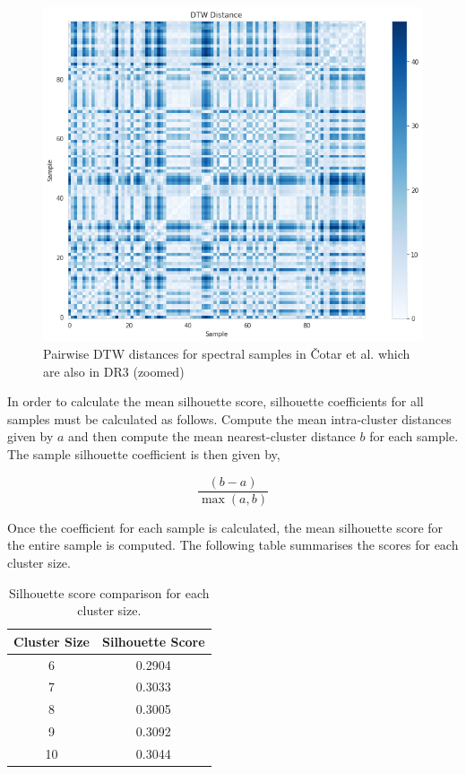 \begin{figure}[t]
\centering
\includegraphics[scale=0.60]{figures/dtw cotar zoomed.png}
\caption{Pairwise DTW distances for spectral samples in Čotar et al. which are also in DR3 (zoomed)}
\end{figure}

In order to calculate the mean silhouette score, silhouette coefficients for all samples must be calculated as follows. Compute the mean intra-cluster distances given by $a$ and then compute the mean nearest-cluster distance $b$ for each sample. The sample silhouette coefficient is then given by,

\begin{equation}
\frac{(b-a)}{\max_{}(a,b)}
\end{equation}

Once the coefficient for each sample is calculated, the mean silhouette score for the entire sample is computed. The following table summarises the scores for each cluster size.


\begin{table}[]
\begin{center}
\begin{tabular}{|c|c|}
\hline
\textbf{Cluster Size} & \textbf{Silhouette Score} \\ \hline
6                     & 0.2904                    \\ \hline
7                     & 0.3033                    \\ \hline
8                     & 0.3005                    \\ \hline
9                     & 0.3092                    \\ \hline
10                    & 0.3044                    \\ \hline
\end{tabular}
\caption{Silhouette score comparison for each cluster size.}
\label{table:Silhouette Score}
\end{center}
\end{table}

